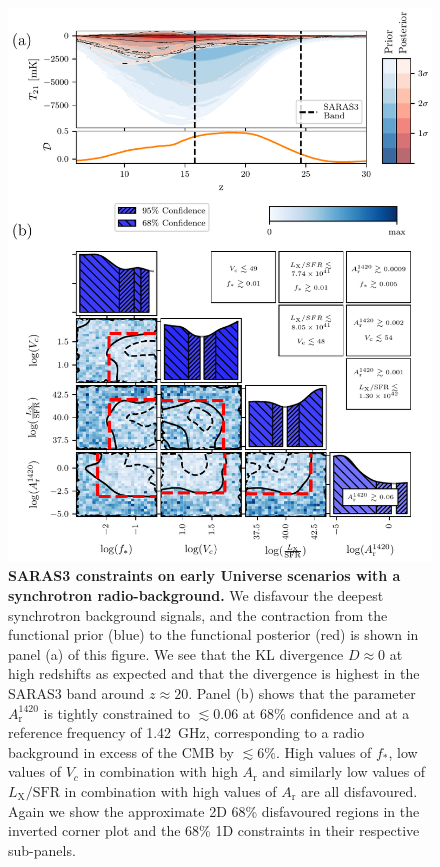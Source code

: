 \begin{figure}[ht!]
    \centering
    \includegraphics{saras3/figs/FigureS3.pdf}
    \caption{\textbf{SARAS3 constraints on early Universe scenarios with a synchrotron radio-background.} We disfavour the deepest synchrotron background signals, and the contraction from the functional prior (blue) to the functional posterior (red) is shown in panel (a) of this figure. We see that the KL divergence $D\approx0$ at high redshifts as expected and that the divergence is highest in the SARAS3 band around $z\approx20$. Panel (b) shows that the parameter $A_{\mathrm{r}}^{1420}$ is tightly constrained to $\lesssim 0.06$ at 68\% confidence and at a reference frequency of 1.42~GHz, corresponding to a radio background in excess of the CMB by $\lesssim 6\%$. High values of $f_*$, low values of $V_c$ in combination with high $A_\mathrm{r}$ and similarly low values of $L_\mathrm{X}/\mathrm{SFR}$ in combination with high values of $A_\mathrm{r}$ are all disfavoured. Again we show the approximate 2D 68\% disfavoured regions in the inverted corner plot and the 68\% 1D constraints in their respective sub-panels.}
    \label{fig:ARad_results}
\end{figure}

